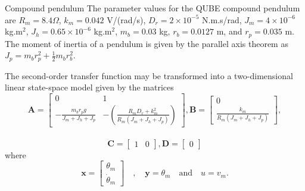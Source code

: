\documentclass[9pt]{beamer-control}
\begin{document}
\begin{frame}{Compound pendulum}
The parameter values for the QUBE compound pendulum are $R_m=8.4\Omega$, $k_m=0.042$ V/(rad/s), $D_r=2\times 10^{-5}$ N.m.s/rad, $J_m = 4\times 10^{-6}$ kg.m$^2$, $J_h = 0.65 \times 10^{-6}$ kg.m$^2$, $m_b=0.03$ kg, $r_b = 0.0127$ m, and $r_p = 0.035$ m.
The moment of inertia of a pendulum is given by the parallel axis theorem as $J_p = m_b r_p^2+ \tfrac{1}{2}m_b r_b^2$.

The second-order transfer function may be transformed into a two-dimensional linear state-space model given by the matrices
\begin{equation}
	\mathbf{A}=\begin{bmatrix}
		0 & 1 \\
		-\tfrac{m_br_p g }{J_m+J_h+J_p} & -\left(\tfrac{R_m D_r + k_m^2}{R_m(J_m+J_h+J_p)}\right)
	\end{bmatrix},
	\mathbf{B} = \begin{bmatrix}
		0 \\ \tfrac{k_m}{R_m(J_m+J_h+J_p)}
	\end{bmatrix},
\end{equation}  \\
\begin{equation}
	\mathbf{C} = \begin{bmatrix}
		1 & 0
	\end{bmatrix},
	\mathbf{D} = \begin{bmatrix}
		0
	\end{bmatrix}
\end{equation}  
where 
\begin{equation}
	\mathbf{x} = \begin{bmatrix}
		\theta_m \\ \dot{\theta}_m
	\end{bmatrix}
	\quad , \quad \mathbf{y} = \theta_m \quad  \text{and} \quad u=v_m.
\end{equation}
\end{frame}
\end{document}
